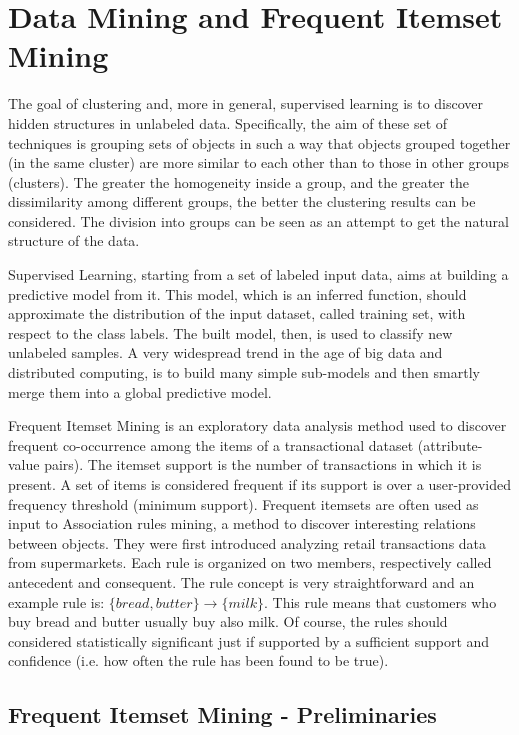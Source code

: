 \section{Data Mining and Frequent Itemset Mining}
The goal of clustering and, more in general, supervised learning is to discover hidden structures in unlabeled data. Specifically, the aim of these set of techniques is grouping sets of objects in such a way that objects grouped together (in the same cluster) are more similar to each other than to those in other groups (clusters). The greater the homogeneity inside a group, and the greater the dissimilarity among different groups, the better the clustering results can be considered. The division into groups can be seen as an attempt to get the natural structure of the data.

Supervised Learning, starting from a set of labeled input data, aims at building a predictive model from it. This model, which is an inferred function, should approximate the distribution of the input dataset, called training set, with respect to the class labels. The built model, then, is used to classify new unlabeled samples. A very widespread trend in the age of big data and distributed computing, is to build many simple sub-models and then smartly merge them into a global predictive model.

Frequent Itemset Mining is an exploratory data analysis method used to discover frequent co-occurrence among the items of a transactional dataset (attribute-value pairs). The itemset support is the number of transactions in which it is present. A set of items is considered frequent if its support is over a user-provided frequency threshold (minimum support).
Frequent itemsets are often used as input to Association rules mining, a method to discover interesting relations between objects. They were first introduced analyzing retail transactions data from supermarkets. Each rule is organized on two members, respectively called antecedent and consequent. The rule concept is very straightforward and an example rule is: $\{bread, butter\} \rightarrow \{milk\}$. This rule means that customers who buy bread and butter usually buy also milk. Of course, the rules should considered statistically significant just if supported by a sufficient support and confidence (i.e. how often the rule has been found to be true).
\subsection{Frequent Itemset Mining - Preliminaries}




